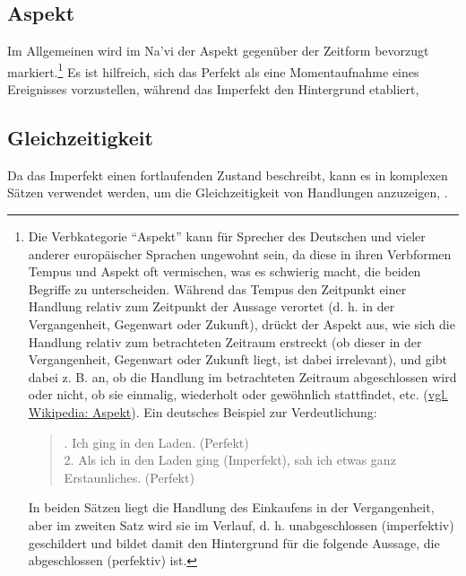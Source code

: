 \subsection{Aspekt} Im Allgemeinen wird im Na'vi der Aspekt gegenüber der Zeitform bevorzugt markiert.\footnote{Die Verbkategorie ``Aspekt'' kann für Sprecher des Deutschen und vieler anderer europäischer Sprachen ungewohnt sein, da diese in ihren Verbformen Tempus und Aspekt oft vermischen, was es schwierig macht, die beiden Begriffe zu unterscheiden. Während das Tempus den Zeitpunkt einer Handlung relativ zum Zeitpunkt der Aussage verortet (d. h. in der Vergangenheit, Gegenwart oder Zukunft), drückt der Aspekt aus, wie sich die Handlung relativ zum betrachteten Zeitraum erstreckt (ob dieser in der Vergangenheit, Gegenwart oder Zukunft liegt, ist dabei irrelevant), und gibt dabei z. B. an, ob die Handlung im betrachteten Zeitraum abgeschlossen wird oder nicht, ob sie einmalig, wiederholt oder gewöhnlich stattfindet, etc. (\href{https://de.wikipedia.org/wiki/Aspekt_(Linguistik)}{vgl. Wikipedia: Aspekt}). Ein deutsches Beispiel zur Verdeutlichung:
	\begin{quotation}
		. Ich ging in den Laden.  (Perfekt)\\
		2.  Als ich in den Laden ging (Imperfekt), sah ich etwas ganz Erstaunliches. (Perfekt)
	\end{quotation}
	In beiden Sätzen liegt die Handlung des Einkaufens in der Vergangenheit, aber im zweiten Satz wird sie im Verlauf, d. h. unabgeschlossen (imperfektiv) geschildert und bildet damit den Hintergrund für die folgende Aussage, die abgeschlossen (perfektiv) ist.} Es ist hilfreich, sich das Perfekt als eine Momentaufnahme eines Ereignisses vorzustellen, während das Imperfekt den Hintergrund etabliert,  

\subsection{Gleichzeitigkeit} Da das Imperfekt einen fortlaufenden Zustand beschreibt, kann es in komplexen Sätzen verwendet werden, um die Gleichzeitigkeit von Handlungen anzuzeigen,  .

